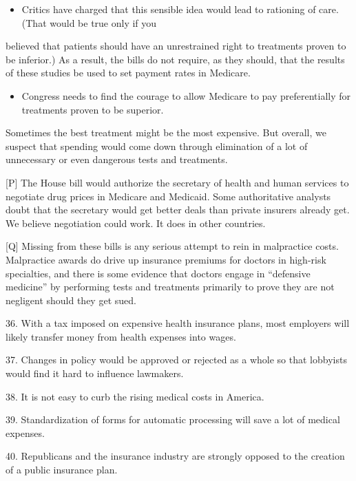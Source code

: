 \documentclass[UTF8,11pt]{ctexart}
\begin{document}
\begin{itemize}[leftmargin=2em,itemsep=.2em,topsep=.4em]\item[N.] Critics have charged that this sensible idea would lead to rationing of care. (That would be true only if you
\end{itemize}

believed that patients should have an unrestrained right to treatments proven to be inferior.) As a result, the bills do not require, as they should, that the results of these studies be used to set payment rates in Medicare.


\begin{itemize}[leftmargin=2em,itemsep=.2em,topsep=.4em]\item[O.] Congress needs to find the courage to allow Medicare to pay preferentially for treatments proven to be superior.
\end{itemize}

Sometimes the best treatment might be the most expensive. But overall, we suspect that spending would come down through elimination of a lot of unnecessary or even dangerous tests and treatments.


[P] The House bill would authorize the secretary of health and human services to negotiate drug prices in Medicare and Medicaid. Some authoritative analysts doubt that the secretary would get better deals than private insurers already get. We believe negotiation could work. It does in other countries.


[Q] Missing from these bills is any serious attempt to rein in malpractice costs. Malpractice awards do drive up insurance premiums for doctors in high-risk specialties, and there is some evidence that doctors engage in “defensive medicine” by performing tests and treatments primarily to prove they are not negligent should they get sued.


36. With a tax imposed on expensive health insurance plans, most employers will likely transfer money from health expenses into wages.


37. Changes in policy would be approved or rejected as a whole so that lobbyists would find it hard to influence lawmakers.


38. It is not easy to curb the rising medical costs in America.


39. Standardization of forms for automatic processing will save a lot of medical expenses.


40. Republicans and the insurance industry are strongly opposed to the creation of a public insurance plan.
\end{document}
